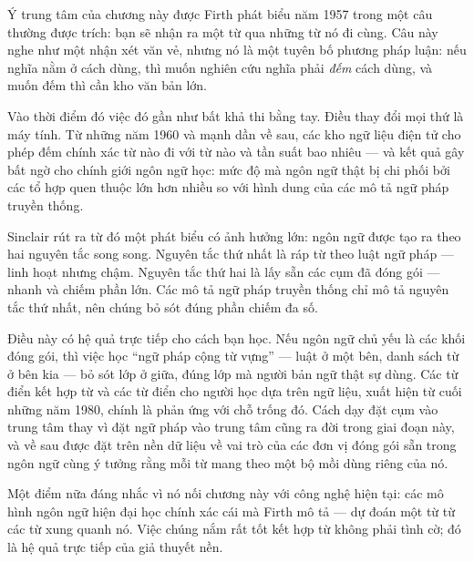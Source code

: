 \documentclass[../../english.tex]{subfiles}
\begin{document}
Ý trung tâm của chương này được Firth phát biểu năm 1957 trong một câu thường được trích\cite{firth1957}: bạn sẽ nhận ra một từ qua những từ nó đi cùng. Câu này nghe như một nhận xét văn vẻ, nhưng nó là một tuyên bố phương pháp luận: nếu nghĩa nằm ở cách dùng, thì muốn nghiên cứu nghĩa phải \emph{đếm} cách dùng, và muốn đếm thì cần kho văn bản lớn.

Vào thời điểm đó việc đó gần như bất khả thi bằng tay. Điều thay đổi mọi thứ là máy tính. Từ những năm 1960 và mạnh dần về sau, các kho ngữ liệu điện tử cho phép đếm chính xác từ nào đi với từ nào và tần suất bao nhiêu --- và kết quả gây bất ngờ cho chính giới ngôn ngữ học: mức độ mà ngôn ngữ thật bị chi phối bởi các tổ hợp quen thuộc lớn hơn nhiều so với hình dung của các mô tả ngữ pháp truyền thống.

Sinclair rút ra từ đó một phát biểu có ảnh hưởng lớn\cite{sinclair1991}: ngôn ngữ được tạo ra theo hai nguyên tắc song song. Nguyên tắc thứ nhất là ráp từ theo luật ngữ pháp --- linh hoạt nhưng chậm. Nguyên tắc thứ hai là lấy sẵn các cụm đã đóng gói --- nhanh và chiếm phần lớn. Các mô tả ngữ pháp truyền thống chỉ mô tả nguyên tắc thứ nhất, nên chúng bỏ sót đúng phần chiếm đa số.

Điều này có hệ quả trực tiếp cho cách bạn học. Nếu ngôn ngữ chủ yếu là các khối đóng gói, thì việc học ``ngữ pháp cộng từ vựng'' --- luật ở một bên, danh sách từ ở bên kia --- bỏ sót lớp ở giữa, đúng lớp mà người bản ngữ thật sự dùng. Các từ điển kết hợp từ và các từ điển cho người học dựa trên ngữ liệu, xuất hiện từ cuối những năm 1980\cite{cobuild1987,ldoce}, chính là phản ứng với chỗ trống đó. Cách dạy đặt cụm vào trung tâm thay vì đặt ngữ pháp vào trung tâm cũng ra đời trong giai đoạn này\cite{lewis1993}, và về sau được đặt trên nền dữ liệu về vai trò của các đơn vị đóng gói sẵn trong ngôn ngữ\cite{wray2002} cùng ý tưởng rằng mỗi từ mang theo một bộ mồi dùng riêng của nó\cite{hoey2005}.

Một điểm nữa đáng nhắc vì nó nối chương này với công nghệ hiện tại: các mô hình ngôn ngữ hiện đại học chính xác cái mà Firth mô tả --- dự đoán một từ từ các từ xung quanh nó. Việc chúng nắm rất tốt kết hợp từ không phải tình cờ; đó là hệ quả trực tiếp của giả thuyết nền.

\begin{gocre}
\end{gocre}
\end{document}
